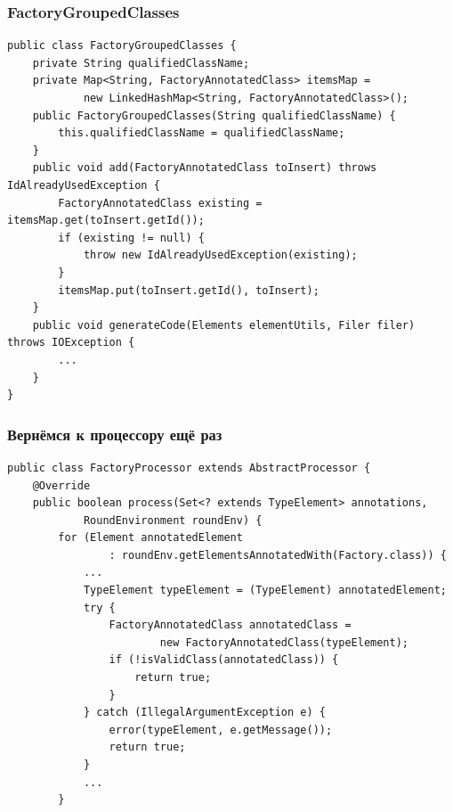\documentclass[xetex,mathserif,serif]{beamer}
\begin{document}
	\begin{frame}[fragile]
		\frametitle{FactoryGroupedClasses}
		\begin{footnotesize}
			\begin{verbatim}
public class FactoryGroupedClasses {
    private String qualifiedClassName;
    private Map<String, FactoryAnnotatedClass> itemsMap =
            new LinkedHashMap<String, FactoryAnnotatedClass>();
    public FactoryGroupedClasses(String qualifiedClassName) {
        this.qualifiedClassName = qualifiedClassName;
    }
    public void add(FactoryAnnotatedClass toInsert) throws IdAlreadyUsedException {
        FactoryAnnotatedClass existing = itemsMap.get(toInsert.getId());
        if (existing != null) {
            throw new IdAlreadyUsedException(existing);
        }
        itemsMap.put(toInsert.getId(), toInsert);
    }
    public void generateCode(Elements elementUtils, Filer filer) throws IOException {
        ...
    }
}
			\end{verbatim}
		\end{footnotesize}
	\end{frame}

	\begin{frame}[fragile]
		\frametitle{Вернёмся к процессору ещё раз}
		\begin{footnotesize}
			\begin{verbatim}
public class FactoryProcessor extends AbstractProcessor {
    @Override
    public boolean process(Set<? extends TypeElement> annotations, 
            RoundEnvironment roundEnv) {
        for (Element annotatedElement 
                : roundEnv.getElementsAnnotatedWith(Factory.class)) {
            ...
            TypeElement typeElement = (TypeElement) annotatedElement;
            try {
                FactoryAnnotatedClass annotatedClass =
                        new FactoryAnnotatedClass(typeElement); 
                if (!isValidClass(annotatedClass)) {
                    return true; 
                }
            } catch (IllegalArgumentException e) {
                error(typeElement, e.getMessage());
                return true;
            }
            ...
        }
			\end{verbatim}
		\end{footnotesize}
	\end{frame}
\end{document}
